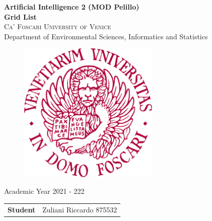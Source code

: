 \begin{titlepage}
    \vspace*{1 cm}
    \begin{center}
         {\LARGE \textbf{Artificial Intelligence 2 (MOD Pelillo) \\ Grid List}\\}
        \vspace{2 cm}
        \textsc{Ca' Foscari University of Venice}\\
        Department of Environmental Sciences, Informatics and Statistics\\
        \vspace{0.2 cm}
        \begin{figure}[h!]
        	\centering
        	\includegraphics[width=0.6\textwidth]{logo} 
        \end{figure}
        Academic Year 2021 - 222\\
        \vspace{3.0 cm}
        	
        \begin{flushleft}
        	\begin{tabular}{l l}
        		\textbf{Student} & Zuliani Riccardo 875532\\
        	\end{tabular}
        \end{flushleft}
    \end{center}
\end{titlepage}
